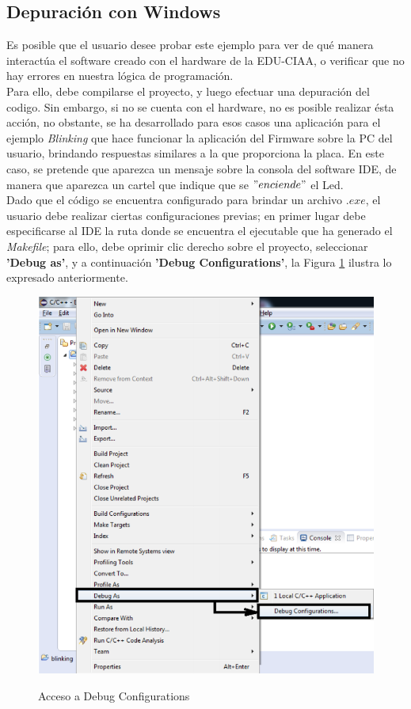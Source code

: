 \documentclass[12pt,letterpaper]{article}
\begin{document}
\subsection{Depuración con Windows}
Es posible que el usuario desee probar este ejemplo  para ver de qué manera interactúa el software creado con
el hardware de la EDU-CIAA, o verificar que no hay errores en nuestra lógica de programación.\\
Para ello, debe compilarse el proyecto, y luego efectuar una depuración del codigo. Sin embargo, si no se cuenta con el hardware, no es posible realizar ésta acción, no obstante, se ha desarrollado para esos casos una aplicación para el ejemplo \textit{Blinking} que hace funcionar la aplicación del Firmware sobre la PC del usuario, brindando respuestas similares a la que proporciona la placa. En este caso, se pretende que aparezca un mensaje sobre la consola del software IDE, de manera que aparezca un cartel que indique que se $"enciende"$ el Led.\\

Dado que el código se encuentra configurado para brindar un archivo \textit{$.exe$}, el usuario debe realizar ciertas configuraciones previas; en primer lugar debe especificarse al IDE la ruta donde se encuentra el ejecutable que ha generado el \textit{Makefile}; para ello, debe oprimir clic derecho sobre el proyecto, seleccionar \textbf{'Debug as'}, y a continuación \textbf{'Debug Configurations'}, la Figura \ref{primer_proy11} ilustra lo expresado anteriormente.

\begin{center}
\begin{figure}[!h]
\centering
\includegraphics[width=5 cm]{figuras/primer_proy11.png}\\
\caption{Acceso a Debug Configurations}
\label{primer_proy11}
\end{figure}
\end{center}
\end{document}
